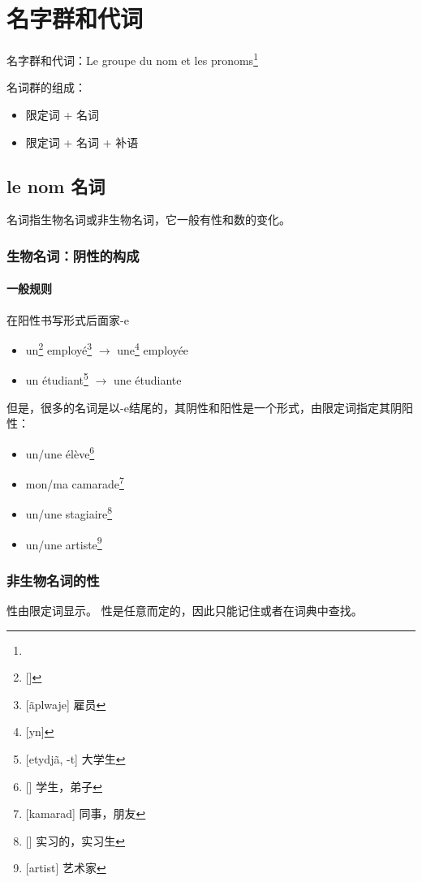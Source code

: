 
\chapter{名字群和代词}
名字群和代词：Le groupe du nom et les pronoms\footnote{}

名词群的组成：
\begin{itemize}
\item 限定词 + 名词
\item 限定词 + 名词 + 补语
\end{itemize}


\section{le nom 名词}
名词指生物名词或非生物名词，它一般有性和数的变化。


\subsection{生物名词：阴性的构成}

\subsubsection{一般规则}

在阳性书写形式后面家-e
\begin{itemize}
\item un\footnote{[\textipa{\~\oe}]} employé\footnote{[\~aplwaje] 雇员} $\rightarrow$ une\footnote{[yn]} employée
\item un étudiant\footnote{[etydj\~a, -t] 大学生} $\rightarrow$ une étudiante
\end{itemize}

但是，很多的名词是以-e结尾的，其阴性和阳性是一个形式，由限定词指定其阴阳性：
\begin{itemize}
\item un/une élève\footnote{[] 学生，弟子}
\item mon/ma camarade\footnote{[kamarad] 同事，朋友}
\item un/une stagiaire\footnote{[] 实习的，实习生}
\item un/une artiste\footnote{[artist] 艺术家}
\end{itemize}

\subsection{非生物名词的性}

性由限定词显示。
性是任意而定的，因此只能记住或者在词典中查找。